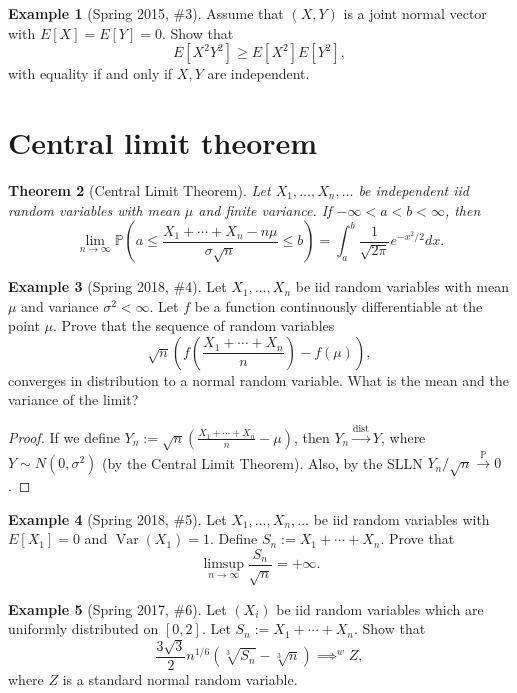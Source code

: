 \documentclass[12pt,reqno]{article}
\theoremstyle{plain}
\newtheorem{theorem}{Theorem}[section]
\theoremstyle{definition}
\newtheorem{example}[theorem]{Example}
\begin{document}
\begin{example}[Spring 2015, \#3]
Assume that $(X, Y)$ is a joint normal vector with $E[X] = E[Y] = 0$. 
Show that 
\[
E[X^2Y^2] \geq E[X^2]E[Y^2], 
\]
with equality if and only if $X,Y$ are independent. 
\end{example}


\newpage 
\section{Central limit theorem} 

\begin{theorem}[Central Limit Theorem]
Let $X_1,\ldots,X_n,\ldots$ be independent iid random variables with 
mean $\mu$ and finite variance. If $-\infty < a < b < \infty$, then 
\[
\lim_{n \rightarrow \infty} \mathbb{P}\left( 
     a \leq \frac{X_1+\cdots+X_n - n\mu}{\sigma\sqrt{n}} \leq b\right) = 
     \int_a^b \frac{1}{\sqrt{2\pi}} e^{-x^2 / 2} dx. 
\]
\end{theorem} 

\begin{example}[Spring 2018, \#4]
Let $X_1,\ldots,X_n$ be iid random variables with mean $\mu$ and 
variance $\sigma^2 < \infty$. Let $f$ be a function continuously 
differentiable at the point $\mu$. Prove that the sequence of random 
variables 
\[
\sqrt{n}\left(f\left(\frac{X_1+\cdots+X_n}{n}\right) - f(\mu)\right), 
\]
converges in distribution to a normal random variable. What is the 
mean and the variance of the limit? 
\end{example} 
\begin{proof}
If we define $Y_n := \sqrt{n}\left(\frac{X_1+\cdots+X_n}{n} - \mu\right)$, 
then $Y_n \xrightarrow{\operatorname{dist}} Y$, where 
$Y \sim N(0, \sigma^2)$ (by the Central Limit Theorem). 
Also, by the SLLN $Y_n / \sqrt{n} \xrightarrow{\mathbb{P}} 0$. 
\end{proof} 

\begin{example}[Spring 2018, \#5]
Let $X_1,\ldots,X_n,\ldots$ be iid random variables with $E[X_1] = 0$ and 
$\operatorname{Var}(X_1) = 1$. Define $S_n := X_1+\cdots+X_n$. 
Prove that 
\[
\limsup_{n \rightarrow \infty} \frac{S_n}{\sqrt{n}} = +\infty. 
\]
\end{example} 

\begin{example}[Spring 2017, \#6]
Let $(X_i)$ be iid random variables which are uniformly distributed on 
$[0,2]$. Let $S_n := X_1+\cdots+X_n$. Show that 
\[
\frac{3\sqrt{3}}{2} n^{1/6}\left(\sqrt[3]{S_n} - \sqrt[3]{n}\right) 
     \implies^{w} Z, 
\]
where $Z$ is a standard normal random variable.  
\end{example} 
\end{document}
